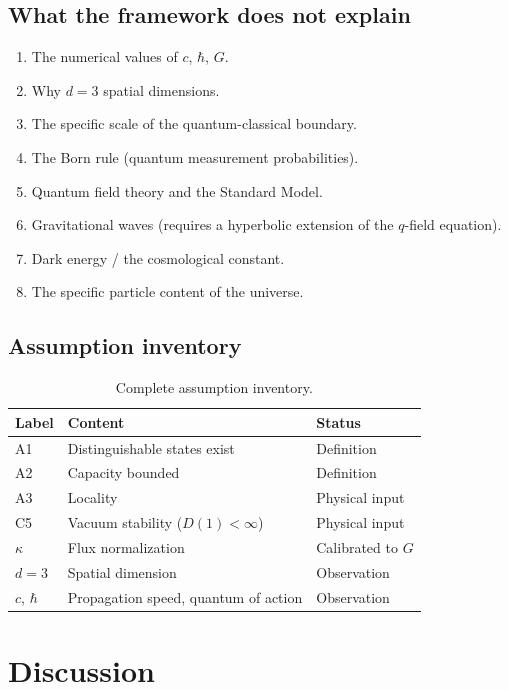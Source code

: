 \documentclass[12pt]{article}
\begin{document}
\subsection{What the framework does not explain}

\begin{enumerate}
\item The numerical values of $c$, $\hbar$, $G$.
\item Why $d=3$ spatial dimensions.
\item The specific scale of the quantum-classical boundary.
\item The Born rule (quantum measurement probabilities).
\item Quantum field theory and the Standard Model.
\item Gravitational waves (requires a hyperbolic extension of the $q$-field equation).
\item Dark energy / the cosmological constant.
\item The specific particle content of the universe.
\end{enumerate}

\subsection{Assumption inventory}

\begin{table}[h]
\caption{Complete assumption inventory.}
\begin{tabular}{lll}
\toprule
Label & Content & Status \\
\midrule
A1 & Distinguishable states exist & Definition \\
A2 & Capacity bounded & Definition \\
A3 & Locality & Physical input \\
C5 & Vacuum stability ($D(1)<\infty$) & Physical input \\
$\kappa$ & Flux normalization & Calibrated to $G$ \\
$d=3$ & Spatial dimension & Observation \\
$c$, $\hbar$ & Propagation speed, quantum of action & Observation \\
\bottomrule
\end{tabular}
\end{table}

\section{Discussion}
\end{document}
